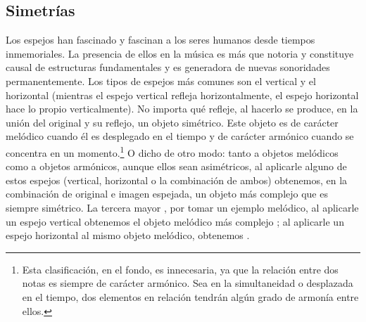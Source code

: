 \documentclass[a4paper,12pt]{article}
\begin{document}
\begin{multicols}{2}

\section{Simetrías}\label{sec:simetrias}
Los espejos han fascinado y fascinan a los seres humanos desde tiempos inmemoriales. La presencia de ellos en la música es más que notoria y constituye causal de estructuras fundamentales y es generadora de nuevas sonoridades permanentemente.  Los tipos de espejos más comunes son el vertical y el horizontal (mientras el espejo vertical refleja horizontalmente, el espejo horizontal hace lo propio verticalmente). No importa qué refleje, al hacerlo se produce, en la unión del original y su reflejo, un objeto simétrico. Este objeto es de carácter melódico cuando él es desplegado en el tiempo y de carácter armónico cuando se concentra en un momento.\footnote{Esta clasificación, en el fondo, es innecesaria, ya que la relación entre dos notas es siempre de carácter armónico. Sea en la simultaneidad o desplazada en el tiempo, dos elementos en relación tendrán algún grado de armonía entre ellos.} O dicho de otro modo: tanto a objetos melódicos como a objetos armónicos, aunque ellos sean asimétricos, al aplicarle alguno de estos espejos (vertical, horizontal o la combinación de ambos) obtenemos, en la combinación de original e imagen espejada, un objeto más complejo que es siempre simétrico. La tercera mayor \hbox{,} por tomar un ejemplo melódico, al aplicarle un espejo vertical obtenemos el objeto melódico más complejo \hbox{;} al aplicarle un espejo horizontal al mismo objeto melódico, obtenemos \hbox{.}


\end{multicols}
\end{document}

